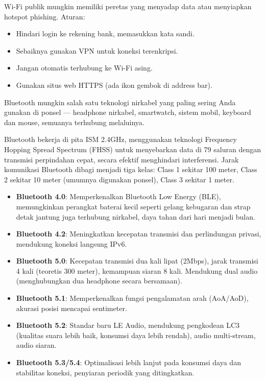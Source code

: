 
Wi-Fi publik mungkin memiliki peretas yang menyadap data atau menyiapkan hotspot phishing. Aturan:

\begin{itemize}
  \item Hindari login ke rekening bank, memasukkan kata sandi.
  \item Sebaiknya gunakan VPN untuk koneksi terenkripsi.
  \item Jangan otomatis terhubung ke Wi-Fi asing.
  \item Gunakan situs web HTTPS (ada ikon gembok di address bar).
\end{itemize}


Bluetooth mungkin salah satu teknologi nirkabel yang paling sering Anda gunakan di ponsel — headphone nirkabel, smartwatch, sistem mobil, keyboard dan mouse, semuanya terhubung melaluinya.


Bluetooth bekerja di pita ISM 2.4GHz, menggunakan teknologi Frequency Hopping Spread Spectrum (FHSS) untuk menyebarkan data di 79 saluran dengan transmisi perpindahan cepat, secara efektif menghindari interferensi. Jarak komunikasi Bluetooth dibagi menjadi tiga kelas: Class 1 sekitar 100 meter, Class 2 sekitar 10 meter (umumnya digunakan ponsel), Class 3 sekitar 1 meter.


\begin{itemize}
  \item \textbf{Bluetooth 4.0}: Memperkenalkan Bluetooth Low Energy (BLE), memungkinkan perangkat baterai kecil seperti gelang kebugaran dan strap detak jantung juga terhubung nirkabel, daya tahan dari hari menjadi bulan.
  \item \textbf{Bluetooth 4.2}: Meningkatkan kecepatan transmisi dan perlindungan privasi, mendukung koneksi langsung IPv6.
  \item \textbf{Bluetooth 5.0}: Kecepatan transmisi dua kali lipat (2Mbps), jarak transmisi 4 kali (teoretis 300 meter), kemampuan siaran 8 kali. Mendukung dual audio (menghubungkan dua headphone secara bersamaan).
  \item \textbf{Bluetooth 5.1}: Memperkenalkan fungsi pengalamatan arah (AoA/AoD), akurasi posisi mencapai sentimeter.
  \item \textbf{Bluetooth 5.2}: Standar baru LE Audio, mendukung pengkodean LC3 (kualitas suara lebih baik, konsumsi daya lebih rendah), audio multi-stream, audio siaran.
  \item \textbf{Bluetooth 5.3/5.4}: Optimalisasi lebih lanjut pada konsumsi daya dan stabilitas koneksi, penyiaran periodik yang ditingkatkan.
\end{itemize}

